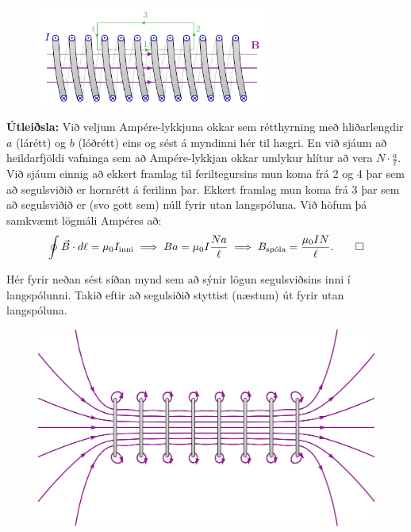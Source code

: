 \ifdefined \wholebook \else\documentclass[oneside]{book}\usepackage{EdlBook}\graphicspath{{figures/}}
\begin{document}
\begin{minipage}{\linewidth}

\begin{figure}
\vspace{-0.5cm}
\includegraphics[width = 3in]{figures/magnetic_field_solenoid(1).pdf}
\end{figure}

\textbf{Útleiðsla:} Við veljum Ampére-lykkjuna okkar sem rétthyrning með hliðarlengdir $a$ (lárétt) og $b$ (lóðrétt) eins og sést á myndinni hér til hægri. En við sjáum að heildarfjöldi vafninga sem að Ampére-lykkjan okkar umlykur hlítur að vera $N \cdot \frac{a}{\ell}$. Við sjáum einnig að ekkert framlag til feriltegursins mun koma frá 2 og 4 þar sem að segulsviðið er hornrétt á ferilinn þar. Ekkert framlag mun koma frá 3 þar sem að segulsviðið er (svo gott sem) núll fyrir utan langspóluna. Við höfum þá samkvæmt lögmáli Ampéres að:
\begin{align*}
    \oint \vec{B} \cdot d\ell = \mu_0 I_{\text{inni}} \implies B a = \mu_0 I \frac{Na}{\ell} \implies B_{\text{spóla}} = \frac{\mu_0 I N}{\ell}.\qed
\end{align*}
\end{minipage}

\vspace{0.2cm}

Hér fyrir neðan sést síðan mynd sem að sýnir lögun segulsviðsins inni í langspólunni. Takið eftir að segulsiðið styttist (næstum) út fyrir utan langspóluna.

\begin{figure}[H]
    \centering
    \includegraphics[scale = 0.05]{figures/magnetic_field_solenoid-002.png}
\end{figure}
\end{document}
